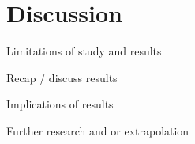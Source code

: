 
\chapter{Discussion}

Limitations of study and results

Recap / discuss results

Implications of results

Further research and or extrapolation
